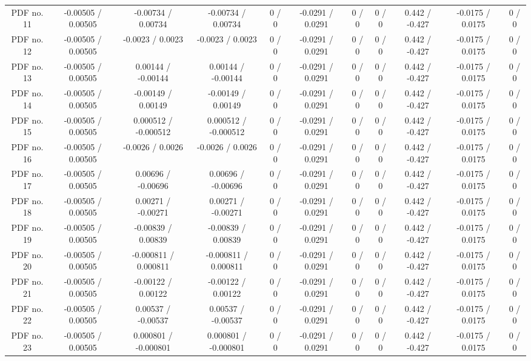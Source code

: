 \begin{table}[htbp]
\begin{center}
\begin{tabular}{|c|c|c|c|c|c|c|c|c|c|c|}
  PDF no. 11 & -0.00505 / 0.00505 & -0.00734 / 0.00734 & -0.00734 / 0.00734 & 0 / 0 & -0.0291 / 0.0291 & 0 / 0 & 0 / 0 & 0.442 / -0.427 & -0.0175 / 0.0175 & 0 / 0 \\ 
  PDF no. 12 & -0.00505 / 0.00505 & -0.0023 / 0.0023 & -0.0023 / 0.0023 & 0 / 0 & -0.0291 / 0.0291 & 0 / 0 & 0 / 0 & 0.442 / -0.427 & -0.0175 / 0.0175 & 0 / 0 \\ 
  PDF no. 13 & -0.00505 / 0.00505 & 0.00144 / -0.00144 & 0.00144 / -0.00144 & 0 / 0 & -0.0291 / 0.0291 & 0 / 0 & 0 / 0 & 0.442 / -0.427 & -0.0175 / 0.0175 & 0 / 0 \\ 
  PDF no. 14 & -0.00505 / 0.00505 & -0.00149 / 0.00149 & -0.00149 / 0.00149 & 0 / 0 & -0.0291 / 0.0291 & 0 / 0 & 0 / 0 & 0.442 / -0.427 & -0.0175 / 0.0175 & 0 / 0 \\ 
  PDF no. 15 & -0.00505 / 0.00505 & 0.000512 / -0.000512 & 0.000512 / -0.000512 & 0 / 0 & -0.0291 / 0.0291 & 0 / 0 & 0 / 0 & 0.442 / -0.427 & -0.0175 / 0.0175 & 0 / 0 \\ 
  PDF no. 16 & -0.00505 / 0.00505 & -0.0026 / 0.0026 & -0.0026 / 0.0026 & 0 / 0 & -0.0291 / 0.0291 & 0 / 0 & 0 / 0 & 0.442 / -0.427 & -0.0175 / 0.0175 & 0 / 0 \\ 
  PDF no. 17 & -0.00505 / 0.00505 & 0.00696 / -0.00696 & 0.00696 / -0.00696 & 0 / 0 & -0.0291 / 0.0291 & 0 / 0 & 0 / 0 & 0.442 / -0.427 & -0.0175 / 0.0175 & 0 / 0 \\ 
  PDF no. 18 & -0.00505 / 0.00505 & 0.00271 / -0.00271 & 0.00271 / -0.00271 & 0 / 0 & -0.0291 / 0.0291 & 0 / 0 & 0 / 0 & 0.442 / -0.427 & -0.0175 / 0.0175 & 0 / 0 \\ 
  PDF no. 19 & -0.00505 / 0.00505 & -0.00839 / 0.00839 & -0.00839 / 0.00839 & 0 / 0 & -0.0291 / 0.0291 & 0 / 0 & 0 / 0 & 0.442 / -0.427 & -0.0175 / 0.0175 & 0 / 0 \\ 
  PDF no. 20 & -0.00505 / 0.00505 & -0.000811 / 0.000811 & -0.000811 / 0.000811 & 0 / 0 & -0.0291 / 0.0291 & 0 / 0 & 0 / 0 & 0.442 / -0.427 & -0.0175 / 0.0175 & 0 / 0 \\ 
  PDF no. 21 & -0.00505 / 0.00505 & -0.00122 / 0.00122 & -0.00122 / 0.00122 & 0 / 0 & -0.0291 / 0.0291 & 0 / 0 & 0 / 0 & 0.442 / -0.427 & -0.0175 / 0.0175 & 0 / 0 \\ 
  PDF no. 22 & -0.00505 / 0.00505 & 0.00537 / -0.00537 & 0.00537 / -0.00537 & 0 / 0 & -0.0291 / 0.0291 & 0 / 0 & 0 / 0 & 0.442 / -0.427 & -0.0175 / 0.0175 & 0 / 0 \\ 
  PDF no. 23 & -0.00505 / 0.00505 & 0.000801 / -0.000801 & 0.000801 / -0.000801 & 0 / 0 & -0.0291 / 0.0291 & 0 / 0 & 0 / 0 & 0.442 / -0.427 & -0.0175 / 0.0175 & 0 / 0 \\ 

\end{tabular}
\end{center}
\end{table}
